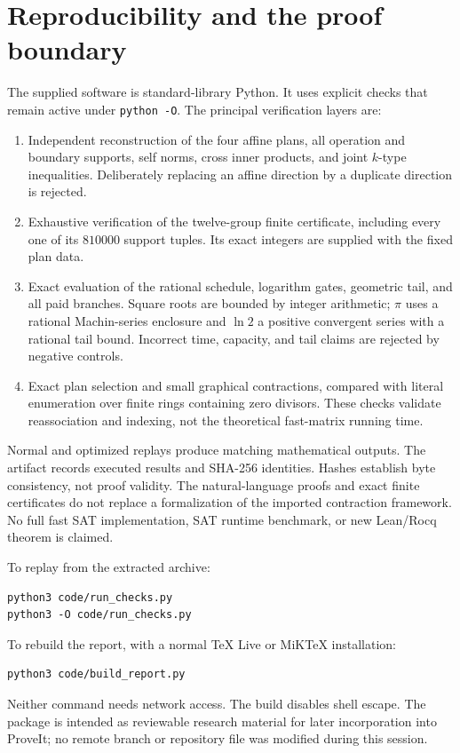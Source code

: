 \documentclass[11pt]{article}
\theoremstyle{definition}\newtheorem{definition}[theorem]{Definition}
\theoremstyle{remark}\newtheorem{remark}[theorem]{Remark}
\begin{document}
\section{Reproducibility and the proof boundary}
\label{sec:validation}

The supplied software is standard-library Python. It uses explicit checks
that remain active under \texttt{python -O}. The principal verification
layers are:
\begin{enumerate}
\item Independent reconstruction of the four affine plans, all operation
and boundary supports, self norms, cross inner products, and joint
$k$-type inequalities. Deliberately replacing an affine direction by a
duplicate direction is rejected.
\item Exhaustive verification of the twelve-group finite certificate,
including every one of its $810000$ support tuples. Its exact integers
are supplied with the fixed plan data.
\item Exact evaluation of the rational schedule, logarithm gates,
geometric tail, and all paid branches. Square roots are bounded by
integer arithmetic; $\pi$ uses a rational Machin-series enclosure and
$\ln2$ a positive convergent series with a rational tail bound.
Incorrect time, capacity, and tail claims are rejected by negative
controls.
\item Exact plan selection and small graphical contractions, compared
with literal enumeration over finite rings containing zero divisors.
These checks validate reassociation and indexing, not the theoretical
fast-matrix running time.
\end{enumerate}
Normal and optimized replays produce matching mathematical outputs.
The artifact records executed results and SHA-256 identities. Hashes
establish byte consistency, not proof validity. The natural-language
proofs and exact finite certificates do not replace a formalization of
the imported contraction framework. No full fast SAT implementation,
SAT runtime benchmark, or new Lean/Rocq theorem is claimed.

To replay from the extracted archive:
\begin{lstlisting}
python3 code/run_checks.py
python3 -O code/run_checks.py
\end{lstlisting}
To rebuild the report, with a normal TeX Live or MiKTeX installation:
\begin{lstlisting}
python3 code/build_report.py
\end{lstlisting}
Neither command needs network access. The build disables shell escape.
The package is intended as reviewable research material for later
incorporation into ProveIt; no remote branch or repository file was
modified during this session.
\end{document}
